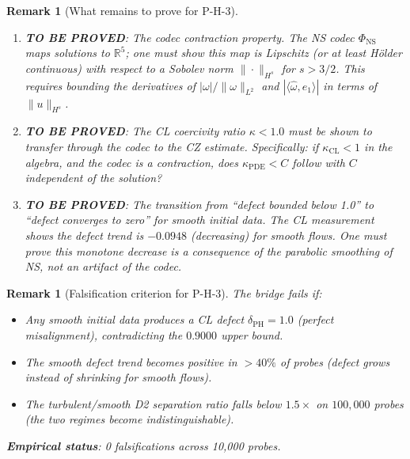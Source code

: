 \documentclass[11pt]{article}
\newtheorem{remark}[lemma]{Remark}
\theoremstyle{definition}
\begin{document}
\begin{remark}[What remains to prove for P-H-3]
\label{rem:ph3-gaps}
\begin{enumerate}
  \item \textbf{TO BE PROVED}: The codec contraction property.
    The NS codec $\Phi_{\mathrm{NS}}$ maps solutions to $\mathbb{R}^5$;
    one must show this map is Lipschitz (or at least H\"older continuous)
    with respect to a Sobolev norm $\|{\cdot}\|_{H^s}$ for $s > 3/2$.
    This requires bounding the derivatives of $|\omega|/\|\omega\|_{L^2}$
    and $|\langle\hat\omega, e_1\rangle|$ in terms of $\|u\|_{H^s}$.

  \item \textbf{TO BE PROVED}: The CL coercivity ratio $\kappa < 1.0$
    must be shown to transfer through the codec to the CZ estimate.
    Specifically: if $\kappa_{\mathrm{CL}} < 1$ in the algebra, and the codec
    is a contraction, does $\kappa_{\mathrm{PDE}} < C$ follow with
    $C$ independent of the solution?

  \item \textbf{TO BE PROVED}: The transition from ``defect bounded below 1.0''
    to ``defect converges to zero'' for smooth initial data.
    The CL measurement shows the defect trend is $-0.0948$ (decreasing)
    for smooth flows.  One must prove this monotone decrease
    is a consequence of the parabolic smoothing of NS, not an artifact of the codec.
\end{enumerate}
\end{remark}

\begin{remark}[Falsification criterion for P-H-3]
\label{rem:ph3-falsify}
The bridge fails if:
\begin{itemize}
  \item Any smooth initial data produces a CL defect $\delta_{\mathrm{PH}} = 1.0$
    (perfect misalignment), contradicting the $0.9000$ upper bound.
  \item The smooth defect trend becomes positive in $>40\%$ of probes
    (defect grows instead of shrinking for smooth flows).
  \item The turbulent/smooth D2 separation ratio falls below $1.5\times$
    on $100{,}000$ probes (the two regimes become indistinguishable).
\end{itemize}
\textbf{Empirical status}: 0 falsifications across 10,000 probes.
\end{remark}


\end{document}
